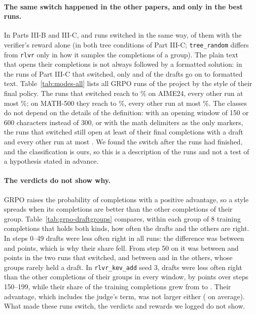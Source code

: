\paragraph{The same switch happened in the other papers, and only in the best runs.} In Parts III-B and III-C,
 and  runs switched in the same way,  of them with the
verifier's reward alone (in both tree conditions of Part III-C; \texttt{tree\_random} differs from \texttt{rlvr} only
in how it samples the completions of a group). The plain text that opens their completions is not always followed by a
formatted solution: in the runs of Part III-C that switched, only  and
 of the drafts go on to formatted text.
Table~\ref{tab:modes-all} lists all  GRPO runs of the project by the style of their final policy. The
 runs that switched reach  to \% on AIME24, every other
run at most \%; on MATH-500 they reach  to \%, every
other run at most \%. The classes do not depend on the details of the definition: with an opening
window of 150 or 600 characters instead of 300, or with the math delimiters as the only markers, the runs that switched
still open at least  of their final completions with a draft and every other run at most
. We found the switch after the runs had finished, and the classification is ours, so this is
a description of the runs and not a test of a hypothesis stated in advance.

\paragraph{The verdicts do not show why.} GRPO raises the probability of completions with a positive advantage, so a
style spreads when its completions are better than the other completions of their group. Table~\ref{tab:grpo-draftgroups}
compares, within each group of 8 training completions that holds both kinds, how often the drafts and the others are
right. In steps 0--49 drafts were less often right in all  runs: the difference was between
 and  points, which is why their share fell. From step 50 on it was between
 and  points in the two runs that switched, and between
 and  in the others, whose groups rarely held a draft. In
\texttt{rlvr\_kev\_add} seed 3, drafts were less often right than the other completions of their groups in every window,
by  points over steps 150--199, while their share of the training completions grew from
 to . Their advantage, which includes the judge's term, was not
larger either ( on average). What made these runs switch, the verdicts and rewards we logged
do not show.


